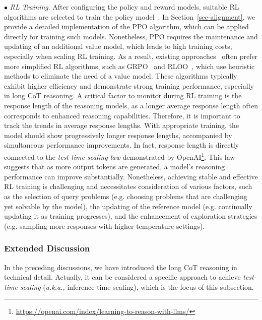 $\bullet$ \emph{ RL Training}. After configuring the policy and reward models, suitable RL algorithms are selected to train the policy model~\cite{zeng2024scaling, chen-2025-still3}. In Section~\ref{sec-alignment}, we provide a detailed implementation of the PPO algorithm, which can be applied directly for training such models. Nonetheless, PPO requires the maintenance and updating of an additional value model, which leads to high training costs, especially when scaling RL training. As a result, existing approaches~\cite{Deepseek-arxiv-2025-DeepSeek} often prefer more simplified RL algorithms, such as GRPO~\cite{Shao-arxiv-2024-Deepseekmath} and RLOO~\cite{Kool-ICLR-2019-Buy}, which use heuristic methods to eliminate the need of a value model. These algorithms typically exhibit higher efficiency and demonstrate strong training performance, especially in long CoT reasoning. A critical factor to monitor during RL training is the response length of the reasoning models, as a longer average response length often corresponds to enhanced reasoning capabilities. Therefore, it is important to track the trends in average response lengths. With appropriate training, the model should show progressively longer response lengths, accompanied by simultaneous performance improvements. In fact, response length is directly connected to the \emph{test-time scaling law} demonstrated by OpenAI\footnote{\url{https://openai.com/index/learning-to-reason-with-llms/}}. This law suggests that as more output tokens are generated, a model's reasoning performance can improve substantially. Nonetheless, achieving stable and effective RL training is challenging and necessitates consideration of various factors, such as the selection of query problems (e.g. choosing problems that are challenging yet solvable by the model), the updating of the reference model (e.g. continually updating it as training progresses), and the enhancement of exploration strategies (e.g. sampling more responses with higher temperature settings).

\subsubsection{Extended Discussion}\label{sec-longcot-discussion}

In the preceding discussions, we have introduced the long CoT reasoning in technical detail. Actually, it can be considered a specific approach to achieve \emph{test-time scaling} (\emph{a.k.a.,} inference-time scaling), which is the focus of this subsection.  

